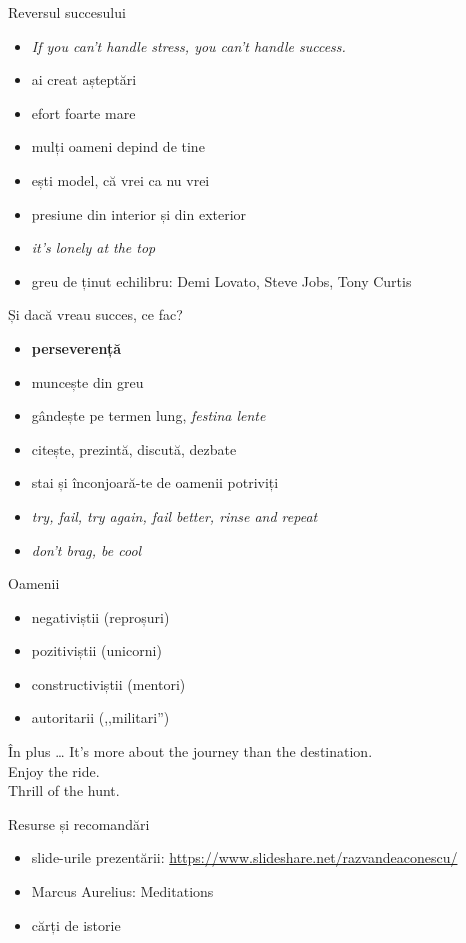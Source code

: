 \documentclass{simple}
\begin{document}
\begin{frame}{Reversul succesului}
  \begin{itemize}
    \pause \item \textit{If you can't handle stress, you can't handle success.}
    \pause \item ai creat așteptări
    \pause \item efort foarte mare
    \pause \item mulți oameni depind de tine
    \pause \item ești model, că vrei ca nu vrei
    \pause \item presiune din interior și din exterior
    \pause \item \textit{it's lonely at the top}
    \pause \item greu de ținut echilibru: Demi Lovato, Steve Jobs, Tony Curtis
  \end{itemize}
\end{frame}

\begin{frame}{Și dacă vreau succes, ce fac?}
  \begin{itemize}
    \pause \item \textbf{perseverență}
    \pause \item muncește din greu
    \pause \item gândește pe termen lung, \textit{festina lente}
    \pause \item citește, prezintă, discută, dezbate
    \pause \item stai și înconjoară-te de oamenii potriviți
    \pause \item \textit{try, fail, try again, fail better, rinse and repeat}
    \pause \item \textit{don't brag, be cool}
  \end{itemize}
\end{frame}

\begin{frame}{Oamenii}
  \begin{itemize}
    \pause \item negativiștii (reproșuri)
    \pause \item pozitiviștii (unicorni)
    \pause \item constructiviștii (mentori)
    \pause \item autoritarii (,,militari'')
  \end{itemize}
\end{frame}

\begin{frame}{În plus \ldots}
  \pause \Large{It's more about the journey than the destination.} \\
  \pause \Large{Enjoy the ride.} \\
  \pause \Large{Thrill of the hunt.} \\
\end{frame}

\begin{frame}{Resurse și recomandări}
  \begin{itemize}
    \item slide-urile prezentării: \url{https://www.slideshare.net/razvandeaconescu/}
    \item Marcus Aurelius: Meditations
    \item cărți de istorie
  \end{itemize}
\end{frame}
\end{document}
